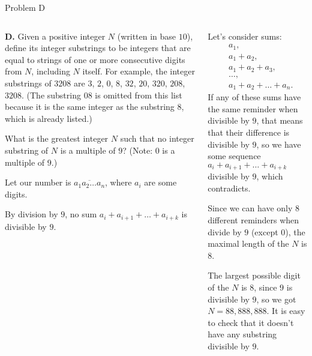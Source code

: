 \documentclass[9pt,aspectratio=169]{beamer}
\begin{document}
\begin{frame}{Problem D}
  \begin{columns}[T]
    \begin{column}{0.5\textwidth}
      \begin{problem}
        \textbf{D.} Given a positive integer $N$ (written in base $10$), define its integer substrings to be integers that are equal to strings of one or more consecutive digits from $N$, including $N$ itself. For example, the integer substrings of $3208$ are $3$, $2$, $0$, $8$, $32$, $20$, $320$, $208$, $3208$. (The substring $08$ is omitted from this list because it is the same integer as the substring $8$, which is already listed.)

        What is the greatest integer $N$ such that no integer substring of $N$ is a multiple of $9$? (Note: $0$ is a multiple of $9$.)
      \end{problem}
      Let our number is $\overline{a_1 a_2 \ldots a_n}$, where $a_i$ are some digits. 
      
      By division by $9$, no sum $a_i + a_{i+1} + \ldots + a_{i + k}$ is divisible by $9$.
      \pause
    \end{column}
    \begin{column}{0.5\textwidth}
      Let's consider sums: 
      \begin{align*}
        &a_1,\\ 
        &a_1 + a_2,\\ 
        &a_1 + a_2 + a_3,\\ 
        &\ldots,\\ 
        &a_1 + a_2 + \ldots + a_n.
      \end{align*}
      \pause
       If any of these sums have the same reminder when divisible by $9$, that means that their difference is divisible by $9$, so we have some sequence $a_i + a_{i+1} + \ldots + a_{i + k}$ divisible by $9$, which contradicts.
       \pause

       Since we can have only $8$ different reminders when divide by $9$ (except $0$), the maximal length of the $N$ is $8$.
      \pause

       The largest possible digit of the $N$ is $8$, since $9$ is divisible by $9$, so we got $\boxed{N = 88,888,888}$.
       \pause
       It is easy to check that it doesn't have any substring divisible by $9$.
    \end{column}
  \end{columns}
\end{frame}
\end{document}
